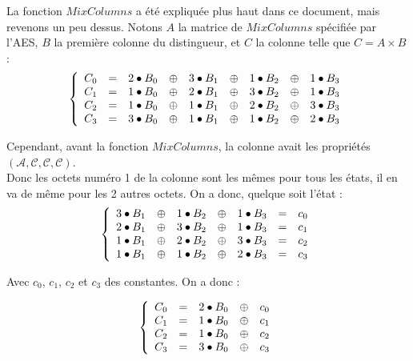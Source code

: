 \indent La fonction $MixColumns$ a été expliquée plus haut dans ce document, mais revenons un peu dessus. Notons $A$ la matrice de $MixColumns$ spécifiée par l'AES, $B$ la première colonne du distingueur, et $C$ la colonne telle que $C = A \times B$ : \\
$$
\left \{
    \begin{array}{c c c c c c c c c}
        C_0 & = & 2 \bullet B_0 & \oplus & 3 \bullet B_1 & \oplus & 1 \bullet B_2 & \oplus & 1 \bullet B_3  \\
        C_1 & = & 1 \bullet B_0 & \oplus & 2 \bullet B_1 & \oplus & 3 \bullet B_2 & \oplus & 1 \bullet B_3  \\
        C_2 & = & 1 \bullet B_0 & \oplus & 1 \bullet B_1 & \oplus & 2 \bullet B_2 & \oplus & 3 \bullet B_3  \\
        C_3 & = & 3 \bullet B_0 & \oplus & 1 \bullet B_1 & \oplus & 1 \bullet B_2 & \oplus & 2 \bullet B_3 
    \end{array}
\right .
$$

\indent Cependant, avant la fonction $MixColumns$, la colonne avait les propriétés $(\mathcal{A}, \mathcal{C}, \mathcal{C}, \mathcal{C})$. \\ 
Donc les octets numéro 1 de la colonne sont les mêmes pour tous les états, il en va de même pour les 2 autres octets. On a donc, quelque soit l'état : \\
$$
\left \{
    \begin{array}{c c c c c c c}
        3 \bullet B_1 & \oplus & 1 \bullet B_2 & \oplus & 1 \bullet B_3 & = & c_0 \\
        2 \bullet B_1 & \oplus & 3 \bullet B_2 & \oplus & 1 \bullet B_3 & = & c_1 \\
        1 \bullet B_1 & \oplus & 2 \bullet B_2 & \oplus & 3 \bullet B_3 & = & c_2 \\
        1 \bullet B_1 & \oplus & 1 \bullet B_2 & \oplus & 2 \bullet B_3 & = & c_3
    \end{array}
\right .
$$

\indent Avec $c_0$, $c_1$, $c_2$ et $c_3$ des constantes. On a donc :

$$
\left \{
    \begin{array}{c c c c c}
        C_0 & = & 2 \bullet B_0 & \oplus & c_0 \\
        C_1 & = & 1 \bullet B_0 & \oplus & c_1 \\
        C_2 & = & 1 \bullet B_0 & \oplus & c_2 \\
        C_3 & = & 3 \bullet B_0 & \oplus & c_3
    \end{array}
\right .
$$

